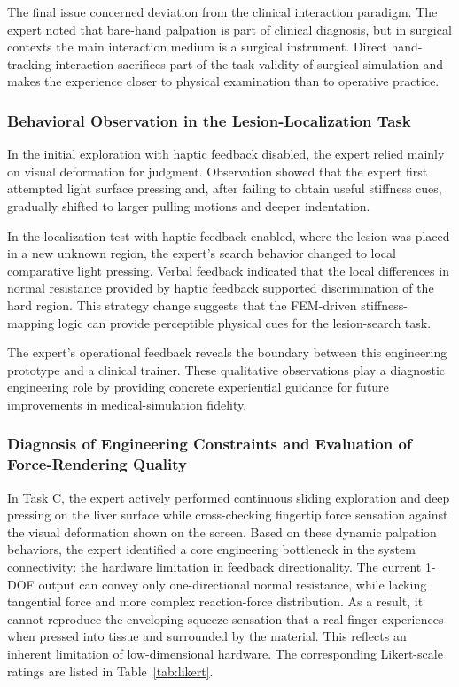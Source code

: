 \documentclass{ieeeaccess}
\begin{document}
The final issue concerned deviation from the clinical interaction paradigm. The expert noted that bare-hand palpation is part of clinical diagnosis, but in surgical contexts the main interaction medium is a surgical instrument. Direct hand-tracking interaction sacrifices part of the task validity of surgical simulation and makes the experience closer to physical examination than to operative practice.


\subsubsection{Behavioral Observation in the Lesion-Localization Task}
In the initial exploration with haptic feedback disabled, the expert relied mainly on visual deformation for judgment. Observation showed that the expert first attempted light surface pressing and, after failing to obtain useful stiffness cues, gradually shifted to larger pulling motions and deeper indentation.

In the localization test with haptic feedback enabled, where the lesion was placed in a new unknown region, the expert's search behavior changed to local comparative light pressing. Verbal feedback indicated that the local differences in normal resistance provided by haptic feedback supported discrimination of the hard region. This strategy change suggests that the FEM-driven stiffness-mapping logic can provide perceptible physical cues for the lesion-search task.

The expert's operational feedback reveals the boundary between this engineering prototype and a clinical trainer. These qualitative observations play a diagnostic engineering role by providing concrete experiential guidance for future improvements in medical-simulation fidelity.

\subsubsection{Diagnosis of Engineering Constraints and Evaluation of Force-Rendering Quality}
In Task C, the expert actively performed continuous sliding exploration and deep pressing on the liver surface while cross-checking fingertip force sensation against the visual deformation shown on the screen. Based on these dynamic palpation behaviors, the expert identified a core engineering bottleneck in the system connectivity: the hardware limitation in feedback directionality. The current 1-DOF output can convey only one-directional normal resistance, while lacking tangential force and more complex reaction-force distribution. As a result, it cannot reproduce the enveloping squeeze sensation that a real finger experiences when pressed into tissue and surrounded by the material. This reflects an inherent limitation of low-dimensional hardware. The corresponding Likert-scale ratings are listed in Table~\ref{tab:likert}.
\end{document}
